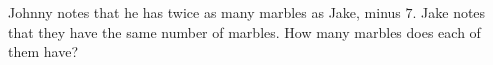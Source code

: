 Johnny notes that he has twice as many marbles as Jake, minus $7$. Jake notes that they have the same number of marbles. How many marbles does each of them have?

